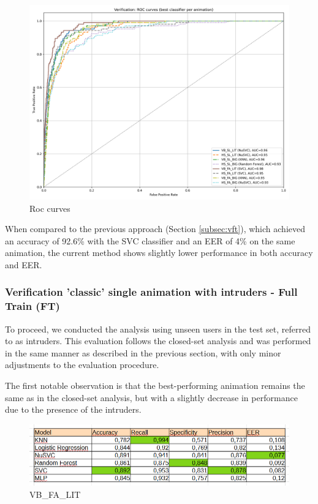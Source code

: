 \documentclass{article}
\begin{document}
\begin{figure}[ht]
    \centering
    \includegraphics[width = 0.6
    \textwidth]{Images/Results/Classic_procedure/Verification_single/ft/Verification_single_roc_classic_ft.png}
    \caption{Roc curves}
    \label{fig:roc_cft}
\end{figure}

When compared to the previous approach (Section \ref{subsec:vft}), which achieved an accuracy of 92.6\% with the SVC classifier and an EER of 4\% on the same animation, the current method shows slightly lower performance in both accuracy and EER.
\FloatBarrier

\subsubsection{Verification 'classic' single animation with intruders - Full Train (FT)}

To proceed, we conducted the analysis using unseen users in the test set, referred to as intruders. 
This evaluation follows the closed-set analysis and was performed in the same manner as described in the previous section, with only minor adjustments to the evaluation procedure.

The first notable observation is that the best-performing animation remains the same as in the closed-set analysis, but with a slightly decrease in performance due to the presence of the intruders.

\begin{figure}[ht]
    \centering
    \includegraphics[width = 0.8
    \textwidth]{Images/Results/Classic_procedure/Verification_intruders/ft/VB_FA_LIT.png}
    \caption{VB\_FA\_LIT}
    \label{fig:VB_FA_LIT_cift}
\end{figure}
\end{document}
